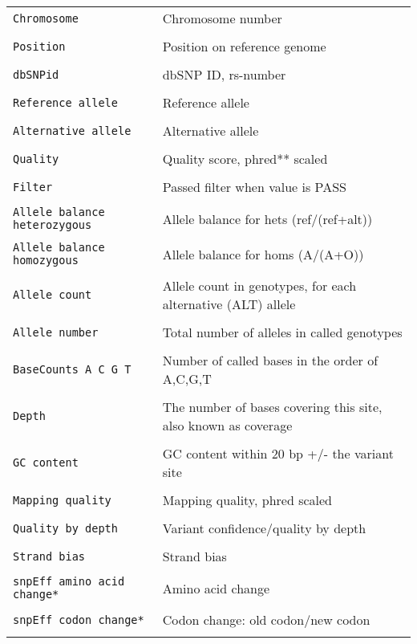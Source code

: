 \documentclass[a4paper,12pt]{article}
\begin{document}
\begin{center}
\begin{longtable}{p{5cm} p{8cm}}
	\tt{Chromosome} & Chromosome number \\\\
	\tt{Position} & Position on reference genome \\\\
	\tt{dbSNPid} & dbSNP ID, rs-number \\\\
	\tt{Reference allele} & Reference allele \\\\
	\tt{Alternative allele} & Alternative allele \\\\
	\tt{Quality} & Quality score, phred** scaled \\\\
	\tt{Filter} & Passed filter when value is PASS \\\\
	\tt{Allele balance heterozygous} & Allele balance for hets (ref/(ref+alt)) \\\\
	\tt{Allele balance homozygous} & Allele balance for homs (A/(A+O)) \\\\
	\tt{Allele count} & Allele count in genotypes, for each alternative (ALT) allele \\\\
	\tt{Allele number} & Total number of alleles in called genotypes \\\\
	\tt{BaseCounts A C G T} & Number of called bases in the order of A,C,G,T \\\\
	\tt{Depth} & The number of bases covering this site, also known as coverage \\\\
	\tt{GC content} & GC content within 20 bp +/- the variant site \\\\
	\tt{Mapping quality} & Mapping quality, phred scaled \\\\
	\tt{Quality by depth} & Variant confidence/quality by depth \\\\
	\tt{Strand bias} & Strand bias \\\\
	\tt{snpEff amino acid change*} & Amino acid change \\\\
	\tt{snpEff codon change*} & Codon change: old codon/new codon \\\\

\end{longtable}
\end{center}
\end{document}
